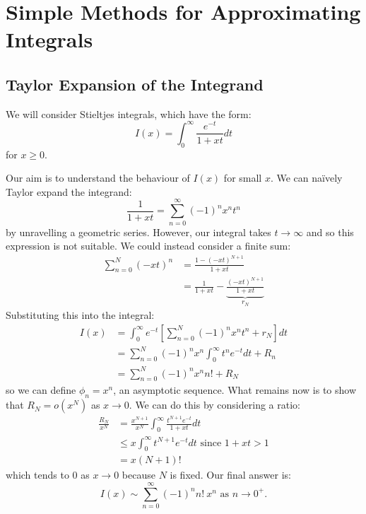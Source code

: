 \documentclass[../Main.tex]{subfiles}
\begin{document}
\section{Simple Methods for Approximating Integrals}
\subsection{Taylor Expansion of the Integrand}
We will consider Stieltjes integrals, which have the form:
\begin{equation*}
    I(x) = \int_{0}^{\infty} \frac{e^{-t}}{1 + xt} dt
\end{equation*}
for $x \geq 0$.

Our aim is to understand the behaviour of $I(x)$ for small $x$. We can na\"ively Taylor expand the integrand:
\begin{equation*}
    \frac{1}{1 + xt} =\sum_{n=0}^{\infty} (-1)^n x^n t^n
\end{equation*}
by unravelling a geometric series. However, our integral takes $t \to \infty$ and so this expression is not suitable. We could instead consider a finite sum:
\begin{align*}
    \sum_{n=0}^{N} (-xt)^n &= \frac{1 - (-xt)^{N+1}}{1 + xt} \\
    &= \frac{1}{1 + xt} - \underbrace{\frac{(-xt)^{N+1}}{1 + xt}}_{r_N}
\end{align*}
Substituting this into the integral:
\begin{align*}
    I(x) &= \int_{0}^{\infty} e^{-t} \left[\sum_{n=0}^{N} (-1)^n x^n t^n + r_N\right] dt \\
    &= \sum_{n=0}^{N} (-1)^n x^n \int_{0}^{\infty} t^n e^{-t} dt + R_n \\
    &= \sum_{n=0}^{N} (-1)^n x^n n! + R_N
\end{align*}
so we can define $\phi_n = x^n$, an asymptotic sequence. What remains now is to show that $R_N = o(x^N)$ as $x \to 0$. We can do this by considering a ratio:
\begin{align*}
    \frac{R_N}{x^N} &= \frac{x^{N+1}}{x^N} \int_{0}^{\infty} \frac{t^{N+1}e^{-t}}{1 + xt} dt \\
    &\leq x \int_{0}^{\infty} t^{N+1}e^{-t} dt \text{ since $1 + xt > 1$} \\
    &= x(N+1)!
\end{align*}
which tends to $0$ as $x \to 0$ because $N$ is fixed. Our final answer is:
\begin{equation*}
    I(x) \sim \sum_{n=0}^{\infty} (-1)^nn!~x^n \text{ as $n \to 0^+$.}
\end{equation*}
\end{document}
